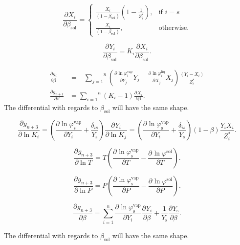\documentclass[internal,english]{sintefmemo2012}
\newcommand*{\pd}[3][]{\frac{\partial^{#1}#2}{\partial{#3}^{#1}}}%
\newcommand{\sol}{\text{sol}}
\newcommand{\liq}{\text{liq}}
\newcommand{\vap}{\text{vap}}
\newcommand{\scomp}{\text{s}\xspace}
\begin{document}
\begin{equation}
  \pd{X_i}{\beta_\sol} = \begin{cases}
    \frac{X_i}{\left(1-\beta_\sol\right)}\left(1-\frac{1}{Z_i^*}\right),& \text{if } i = s\\
    \frac{X_i}{\left(1-\beta_\sol\right)},            & \text{otherwise}.
\end{cases}
 \end{equation}

\begin{equation}
   \pd{Y_i}{\beta_\sol} = K_i\pd{X_i}{\beta_\sol}.
\end{equation}

\begin{align}
   \pd{g_i}{\beta} &= -\overset{n}{\underset{j=1}{\sum}}\left(\pd{\ln \varphi^\vap_i}{Y_j}Y_j - \pd{\ln \varphi^\liq_i}{X_j}X_j\right)\frac{\left(Y_i - X_i\right)}{Z_i^*}\\
   \pd{g_{n+1}}{\beta} &= \overset{n}{\underset{i=1}{\sum}}\left(K_i-1\right)\pd{X_i}{\beta}.
\end{align}
The differential with regards to $\beta_\sol$ will have the same
shape.

\begin{equation}
   \pd{g_{n+3}}{\ln K_i} = \left(\pd{\ln
       \varphi^\vap_\scomp}{Y_i} +
     \frac{\delta_{is}}{Y_\scomp}\right) \pd{Y_i}{\ln K_j} = \left(\pd{\ln
       \varphi^\vap_\scomp}{Y_i} +
     \frac{\delta_{is}}{Y_\scomp}\right) \left(1-\beta\right)\frac{Y_iX_i}{Z_i^*}.
\end{equation}

\begin{equation}
   \pd{g_{n+3}}{\ln T} = T\left(\pd{\ln \varphi^\vap_\scomp}{T} - \pd{\ln \varphi^\sol}{T}\right).
\end{equation}

\begin{equation}
   \pd{g_{n+3}}{\ln P} = P\left(\pd{\ln \varphi^\vap_\scomp}{P} - \pd{\ln \varphi^\sol}{P}\right).
\end{equation}

\begin{equation}
   \pd{g_{n+3}}{\beta} = \overset{n}{\underset{i=1}{\sum}}\pd{\ln \varphi^\vap_\scomp}{Y_i}\pd{Y_i}{\beta} + \frac{1}{Y_\scomp}\pd{Y_\scomp}{\beta}.
\end{equation}

The differential with regards to $\beta_\sol$ will have the same shape.
\end{document}
